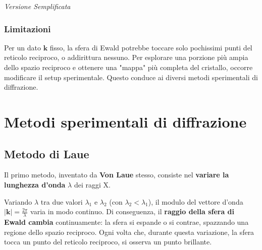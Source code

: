 \begin{center}
\begin{minipage}{0.48\textwidth}
        
        \vspace{0.5cm}
        \textit{Versione Semplificata}
    \end{minipage}
\end{center}
\vspace{0.5cm}
\subsubsection{Limitazioni}

Per un dato $\mathbf{k}$ fisso, la sfera di Ewald potrebbe toccare solo pochissimi punti del reticolo reciproco, o addirittura nessuno. Per esplorare una porzione più ampia dello spazio reciproco e ottenere una "mappa" più completa del cristallo, occorre modificare il setup sperimentale. Questo conduce ai diversi metodi sperimentali di diffrazione.

\section{Metodi sperimentali di diffrazione}

\subsection*{Metodo di Laue}

Il primo metodo, inventato da \textbf{Von Laue} stesso, consiste nel \textbf{variare la lunghezza d'onda} $\lambda$ dei raggi X.

Variando $\lambda$ tra due valori $\lambda_1$ e $\lambda_2$ (con $\lambda_2 < \lambda_1$), il modulo del vettore d'onda $|\mathbf{k}| = \frac{2\pi}{\lambda}$ varia in modo continuo. Di conseguenza, il \textbf{raggio della sfera di Ewald cambia} continuamente: la sfera si espande o si contrae, spazzando una regione dello spazio reciproco. Ogni volta che, durante questa variazione, la sfera tocca un punto del reticolo reciproco, si osserva un punto brillante.

